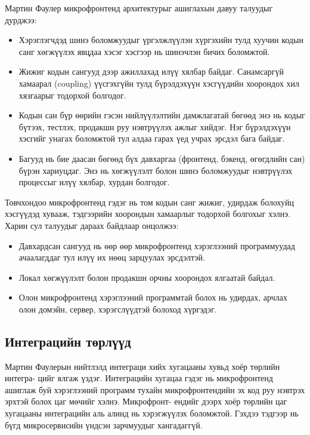 Мартин Фаулер \cite{fowler_microfrontends} микрофронтенд архитектурыг ашиглахын давуу талуудыг дурджээ:
\begin{itemize}
	\item Хэрэглэгчдэд шинэ боломжуудыг үргэлжлүүлэн хүргэхийн тулд хуучин кодын санг хөгжүүлэх явцдаа хэсэг хэсгээр нь шинэчлэн бичих боломжтой.
	\item Жижиг кодын сангууд дээр ажиллахад илүү хялбар байдаг. Санамсаргүй хамаарал (coupling) үүсгэхгүйн тулд бүрэлдэхүүн хэсгүүдийн хоорондох хил хязгаарыг тодорхой болгодог.
	\item Кодын сан бүр өөрийн гэсэн нийлүүлэлтийн дамжлагатай бөгөөд энэ нь кодыг бүтээх, тестлэх, продакшн руу нэвтрүүлэх ажлыг хийдэг. Нэг бүрэлдэхүүн хэсгийг унагах боломжтой тул алдаа гарах үед учрах эрсдэл бага байдаг.
	\item Багууд нь бие даасан бөгөөд бүх давхаргаа (фронтенд, бэкенд, өгөгдлийн сан) бүрэн хариуцдаг. Энэ нь хөгжүүлэлт болон шинэ боломжуудыг нэвтрүүлэх процессыг илүү хялбар, хурдан болгодог.
\end{itemize}

Товчхондоо микрофронтенд гэдэг нь том кодын санг жижиг, удирдаж болохуйц хэсгүүдэд хувааж, тэдгээрийн хоорондын хамаарлыг тодорхой болгохыг хэлнэ. Харин сул талуудыг дараах байдлаар онцолжээ:
\begin{itemize}
	\item Давхардсан сангууд нь өөр өөр микрофронтенд хэрэглээний программуудад ачаалагддаг тул илүү их нөөц зарцуулах эрсдэлтэй.
	\item Локал хөгжүүлэлт болон продакшн орчны хоорондох ялгаатай байдал.
	\item Олон микрофронтенд хэрэглээний программтай болох нь удирдах, арчлах олон домэйн, сервер, хэрэгслүүдтэй болоход хүргэдэг.
\end{itemize}

\subsection{Интеграцийн төрлүүд}
\label{sec:integration-types}
Мартин Фаулерын \cite{microfrontends_info} нийтлэлд интеграци хийх хугацааны хувьд хоёр төрлийн интегра- цийг ялгаж үздэг. Интеграцийн хугацаа гэдэг нь микрофронтенд ашиглаж буй хэрэглээний программ тухайн микрофронтендийн эх код руу нэвтрэх эрхтэй болох цаг мөчийг хэлнэ. Микрофронт- ендийг дээрх хоёр төрлийн цаг хугацааны интеграцийн аль алинд нь хэрэгжүүлэх боломжтой. Гэхдээ тэдгээр нь бүгд микросервисийн үндсэн зарчмуудыг хангадаггүй.
